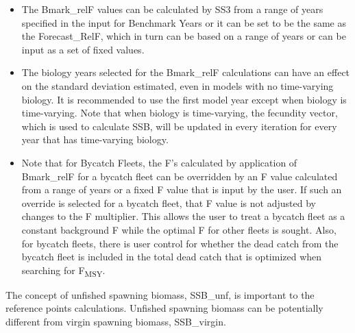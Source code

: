 \begin{itemize}
	\item The Bmark\_relF values can be calculated by SS3 from a range of years specified in the input for Benchmark Years or it can be set to be the same as the Forecast\_RelF, which in turn can be based on a range of years or can be input as a set of fixed values.
	
	\item The biology years selected for the Bmark\_relF calculations can have an effect on the standard deviation estimated, even in models with no time-varying biology. It is recommended to use the first model year except when biology is time-varying. Note that when biology is time-varying, the fecundity vector, which is used to calculate SSB, will be updated in every iteration for every year that has time-varying biology.
	
	\item Note that for Bycatch Fleets, the F's calculated by application of Bmark\_relF for a bycatch fleet can be overridden by an F value calculated from a range of years or a fixed F value that is input by the user. If such an override is selected for a bycatch fleet, that F value is not adjusted by changes to the F multiplier. This allows the user to treat a bycatch fleet as a constant background F while the optimal F for other fleets is sought. Also, for bycatch fleets, there is user control for whether the dead catch from the bycatch fleet is included in the total dead catch that is optimized when searching for F\textsubscript{MSY}.
\end{itemize}

The concept of unfished spawning biomass, SSB\_unf, is important to the reference points calculations. Unfished spawning biomass can be potentially different from virgin spawning biomass, SSB\_virgin.

